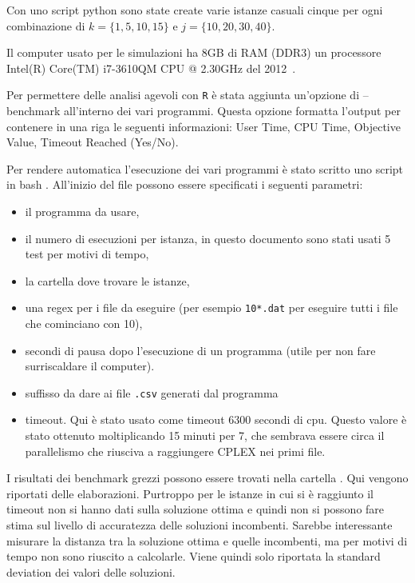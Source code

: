 \documentclass{scrartcl}
\begin{document}
Con uno script python  sono state create varie istanze casuali cinque per ogni 
combinazione di $k = \{1,5,10,15\}$ e $j = \{10,20,30,40\}$. 

Il computer usato per le simulazioni ha 8GB di RAM (DDR3) un processore Intel(R) Core(TM) i7-3610QM CPU @ 2.30GHz del 2012~\cite{cpu}.

Per permettere delle analisi agevoli con \verb|R| è stata aggiunta un'opzione di --benchmark all'interno dei vari programmi. 
Questa opzione formatta l'output per contenere in una riga le seguenti informazioni: User Time, CPU Time, Objective Value, Timeout Reached (Yes/No).

Per rendere automatica l'esecuzione dei vari programmi è stato scritto uno script in bash . 
All'inizio del file possono essere specificati i seguenti parametri:
\begin{itemize}
\item il programma da usare, 
\item il numero di esecuzioni per istanza, in questo documento sono stati usati 5 test per motivi di tempo,
\item la cartella dove trovare le istanze, 
\item una regex per i file da eseguire  (per esempio \verb|10*.dat| per eseguire tutti i file che cominciano con 10), 
\item secondi di pausa dopo l'esecuzione di un programma (utile per non fare surriscaldare il computer).
\item suffisso da dare ai file \verb|.csv| generati dal programma
\item timeout. Qui è stato usato come timeout 6300 secondi di cpu. Questo valore è stato ottenuto moltiplicando 15 minuti per 7, che sembrava essere
circa il parallelismo che riusciva a raggiungere CPLEX nei primi file.
\end{itemize}

I risultati dei benchmark grezzi possono essere trovati nella cartella . Qui vengono riportati delle elaborazioni.
Purtroppo per le istanze in cui si è raggiunto il timeout non si hanno dati sulla soluzione ottima e quindi non si possono 
fare stima sul livello di accuratezza delle soluzioni incombenti. Sarebbe interessante misurare la distanza tra la soluzione ottima
e quelle incombenti, ma per motivi di tempo non sono riuscito a calcolarle. Viene quindi solo riportata la standard deviation dei valori
delle soluzioni.
\end{document}
